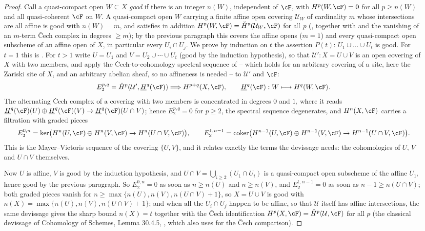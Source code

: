 \begin{proof}
Call a quasi-compact open $W\subseteq X$ \emph{good} if there is an
integer $n(W)$, independent of $\cF$, with $H^p(W,\cF)=0$ for all
$p\ge n(W)$ and all quasi-coherent $\cF$ on $W$.  A quasi-compact open
$W$ carrying a finite affine open covering $\mathcal U_W$ of
cardinality $m$ whose intersections are all affine is good with
$n(W)=m$, and satisfies in addition
$H^p(W,\cF)=\check H^p(\mathcal U_W,\cF)$ for all $p$
(, together with
 and the vanishing of an $m$-term Čech
complex in degrees $\ge m$); by the previous paragraph this covers the
affine opens ($m=1$) and every quasi-compact open subscheme of an
affine open of $X$, in particular every $U_i\cap U_j$.  We prove by
induction on $t$ the assertion $P(t)$: $U_1\cup\dots\cup U_t$ is good.
For $t=1$ this is .  For $t>1$ write
$U=U_1$ and $V=U_2\cup\cdots\cup U_t$ (good by the induction
hypothesis), so that $\mathcal U':X=U\cup V$ is an open covering of
$X$ with two members, and apply the Čech-to-cohomology spectral
sequence of  -- which holds for an
arbitrary covering of a site, here the Zariski site of $X$, and an
arbitrary abelian sheaf, so no affineness is needed -- to
$\mathcal U'$ and $\cF$:
\[
E_2^{p,q}=\check H^p(\mathcal U',\underline H^q(\cF))
\Longrightarrow H^{p+q}(X,\cF),\qquad
\underline H^q(\cF):W\longmapsto H^q(W,\cF).
\]
The alternating Čech complex of a covering with two members is
concentrated in degrees $0$ and $1$, where it reads
$\underline H^q(\cF)(U)\oplus\underline H^q(\cF)(V)\to
\underline H^q(\cF)(U\cap V)$; hence $E_2^{p,q}=0$ for $p\ge2$, the
spectral sequence degenerates, and $H^n(X,\cF)$ carries a filtration
with graded pieces
\[
E_2^{0,n}=\ker\bigl(H^n(U,\cF)\oplus H^n(V,\cF)\to
H^n(U\cap V,\cF)\bigr),\qquad
E_2^{1,n-1}=\operatorname{coker}\bigl(H^{n-1}(U,\cF)\oplus
H^{n-1}(V,\cF)\to H^{n-1}(U\cap V,\cF)\bigr).
\]
This is the Mayer--Vietoris sequence of the covering $\{U,V\}$, and it
relates exactly the terms the devissage needs: the cohomologies of
$U$, $V$ and $U\cap V$ themselves.

Now $U$ is affine, $V$ is good by the induction hypothesis, and
$U\cap V=\bigcup_{i\ge2}(U_1\cap U_i)$ is a quasi-compact open
subscheme of the affine $U_1$, hence good by the previous paragraph.
So $E_2^{0,n}=0$ as soon as $n\ge n(U)$ and $n\ge n(V)$, and
$E_2^{1,n-1}=0$ as soon as $n-1\ge n(U\cap V)$; both graded pieces
vanish for $n\ge\max\{n(U),n(V),n(U\cap V)+1\}$, so $X=U\cup V$ is
good with
$n(X)=\max\{n(U),n(V),n(U\cap V)+1\}$; and when all the $U_i\cap U_j$
happen to be affine, so that $\mathcal U$ itself has affine
intersections, the same devissage gives the sharp bound $n(X)=t$
together with the Čech identification
$H^p(X,\cF)=\check H^p(\mathcal U,\cF)$ for all $p$ (the classical
devissage of Cohomology of Schemes, Lemma 30.4.5,
, which also uses  for
the Čech comparison).


\end{proof}
